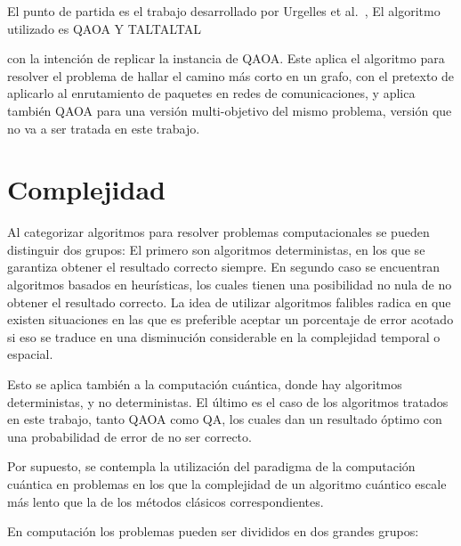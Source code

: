 El punto de partida es el trabajo desarrollado por Urgelles et al.~\cite{multi-objective_routing_optimization},
El algoritmo utilizado es QAOA Y TALTALTAL

con la intención de replicar la instancia de QAOA.
Este aplica el algoritmo para resolver el problema de hallar el camino más corto en un grafo, con el pretexto de aplicarlo al enrutamiento de paquetes en redes de comunicaciones, y aplica también QAOA para una versión multi-objetivo del mismo problema, versión que no va a ser tratada en este trabajo.  %


\section{Complejidad}

Al categorizar algoritmos para resolver problemas computacionales se pueden distinguir dos grupos:
El primero son algoritmos deterministas, en los que se garantiza obtener el resultado correcto siempre.
En segundo caso se encuentran algoritmos basados en heurísticas, los cuales tienen una posibilidad no nula de no obtener el resultado correcto.
La idea de utilizar algoritmos falibles radica en que existen situaciones en las que es preferible aceptar un porcentaje de error acotado si eso se traduce en una disminución considerable en la complejidad temporal o espacial.

Esto se aplica también a la computación cuántica, donde hay algoritmos deterministas, y no deterministas.  %
El último es el caso de los algoritmos tratados en este trabajo, tanto QAOA como QA, los cuales dan un resultado óptimo con una probabilidad de error de no ser correcto.  %

Por supuesto, se contempla la utilización del paradigma de la computación cuántica en problemas en los que la complejidad de un algoritmo cuántico escale más lento que la de los métodos clásicos correspondientes.


En computación los problemas pueden ser divididos en dos grandes grupos:

